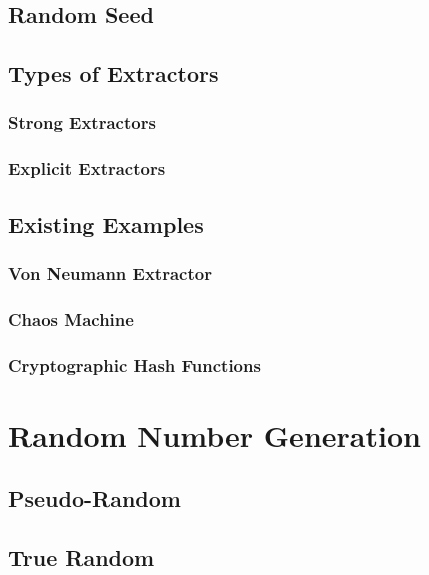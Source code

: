 \subsection{Random Seed}

\subsection{Types of Extractors}

\subsubsection{Strong Extractors}

\subsubsection{Explicit Extractors}

\subsection{Existing Examples}

\subsubsection{Von Neumann Extractor}

\subsubsection{Chaos Machine}

\subsubsection{Cryptographic Hash Functions}

\section{Random Number Generation}

\subsection{Pseudo-Random}

\subsection{True Random}